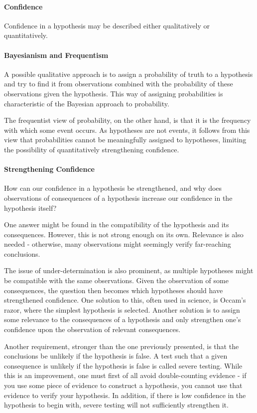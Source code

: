 \paragraph{Confidence}
Confidence in a hypothesis may be described either qualitatively or quantitatively.

\paragraph{Bayesianism and Frequentism}
A possible qualitative approach is to assign a probability of truth to a hypothesis and try to find it from observations combined with the probability of these observations given the hypothesis. This way of assigning probabilities is characteristic of the Bayesian approach to probability.

The frequentist view of probability, on the other hand, is that it is the frequency with which some event occurs. As hypotheses are not events, it follows from this view that probabilities cannot be meaningfully assigned to hypotheses, limiting the possibility of quantitatively strengthening confidence.

\paragraph{Strengthening Confidence}
How can our confidence in a hypothesis be strengthened, and why does observations of consequences of a hypothesis increase our confidence in the hypothesis itself?

One answer might be found in the compatibility of the hypothesis and its consequences. However, this is not strong enough on its own. Relevance is also needed - otherwise, many observations might seemingly verify far-reaching conclusions.

The issue of under-determination is also prominent, as multiple hypotheses might be compatible with the same observations. Given the observation of some consequences, the question then becomes which hypotheses should have strengthened confidence. One solution to this, often used in science, is Occam's razor, where the simplest hypothesis is selected. Another solution is to assign some relevance to the consequences of a hypothesis and only strengthen one's confidence upon the observation of relevant consequences.

Another requirement, stronger than the one previously presented, is that the conclusions be unlikely if the hypothesis is false. A test such that a given consequence is unlikely if the hypothesis is false is called severe testing. While this is an improvement, one must first of all avoid double-counting evidence - if you use some piece of evidence to construct a hypothesis, you cannot use that evidence to verify your hypothesis. In addition, if there is low confidence in the hypothesis to begin with, severe testing will not sufficiently strengthen it.

